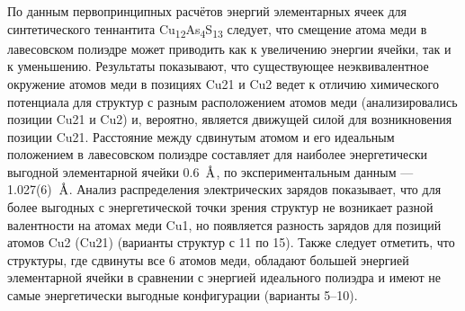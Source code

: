 По данным первопринципных расчётов энергий элементарных ячеек для синтетического теннантита Cu\textsubscript{12}As\textsubscript{4}S\textsubscript{13} следует,  что смещение атома меди в лавесовском полиэдре может приводить как к увеличению энергии ячейки, так и к уменьшению.
Результаты показывают, что существующее неэквивалентное  окружение атомов меди в позициях Cu21 и Cu2 ведет к отличию химического потенциала для структур с разным расположением атомов меди (анализировались позиции Cu21 и Cu2) и, вероятно, является движущей силой для возникновения позиции Cu21. Расстояние между сдвинутым атомом и его идеальным положением в лавесовском полиэдре составляет для наиболее энергетически выгодной элементарной ячейки 0.6~$\mbox{\normalfont\AA}$, по экспериментальным данным --- 1.027(6)~$\mbox{\normalfont\AA}$.
Анализ распределения электрических зарядов показывает, что для более выгодных с энергетической точки зрения структур не возникает разной валентности на атомах меди Cu1,
но появляется разность зарядов для позиций атомов Cu2 (Cu21) (варианты структур с 11 по 15). Также следует отметить, что структуры, где сдвинуты все 6 атомов меди, обладают большей энергией элементарной ячейки в сравнении с энергией идеального полиэдра и имеют не самые энергетически выгодные конфигурации  (варианты 5--10).




